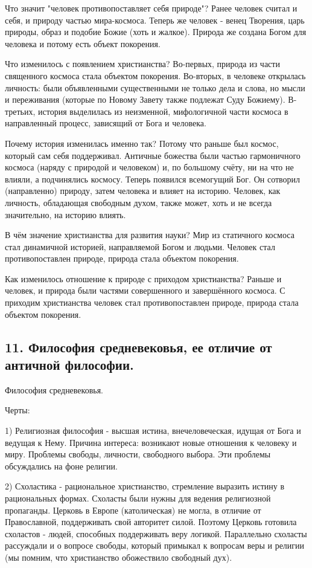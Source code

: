 \documentclass[a4paper, 12pt]{article}
\begin{document}
Что значит "человек противопоставляет себя природе"?
Ранее человек считал и себя, и природу частью мира-космоса.
Теперь же человек - венец Творения, царь природы, образ и подобие Божие (хоть и жалкое).
Природа же создана Богом для человека и потому есть объект покорения.

Что изменилось с появлением христианства?
Во-первых, природа из части священного космоса стала объектом покорения.
Во-вторых, в человеке открылась личность: были объявленными существенными не только дела и слова,
но мысли и переживания (которые по Новому Завету также подлежат Суду Божиему).
В-третьих, история выделилась из неизменной, мифологичной части космоса в направленный процесс, зависящий от Бога и человека.

Почему история изменилась именно так?
Потому что раньше был космос, который сам себя поддерживал.
Античные божества были частью гармоничного космоса (наряду с природой и человеком) и, по большому счёту,
ни на что не влияли, а подчинялись космосу.
Теперь появился всемогущий Бог. Он сотворил (направленно) природу, затем человека и влияет на историю.
Человек, как личность, обладающая свободным духом, также может, хоть и не всегда значительно, на историю влиять.

В чём значение христианства для развития науки?
Мир из статичного космоса стал динамичной историей, направляемой Богом и людьми.
Человек стал противопоставлен природе, природа стала объектом покорения.

Как изменилось отношение к природе с приходом христианства?
Раньше и человек, и природа были частями совершенного и завершённого космоса.
С приходим христианства человек стал противопоставлен природе, природа стала объектом покорения.


\subsection*{\textbf{11. Философия средневековья, ее отличие от античной философии.}}
Философия средневековья. 

Черты:

1)	Религиозная философия - высшая истина, внечеловеческая, идущая от Бога и ведущая к Нему. Причина интереса: возникают новые отношения к человеку и миру. Проблемы свободы, личности, свободного выбора. Эти проблемы обсуждались на фоне религии.

2)	Схоластика - рациональное христианство, стремление выразить истину в рациональных формах. 
Схоласты были нужны для ведения религиозной пропаганды. Церковь в Европе (католическая) не могла, в отличие от Православной, поддерживать свой авторитет силой. Поэтому Церковь готовила схоластов - людей, способных поддерживать веру логикой. Параллельно схоласты рассуждали и о вопросе свободы, который примыкал к вопросам веры и религии (мы помним, что христианство обожествило свободный дух).
\end{document}
